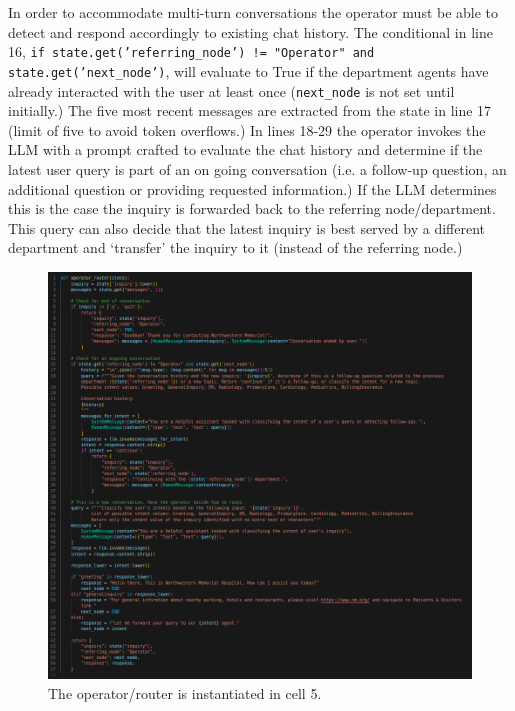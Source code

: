 \documentclass[11pt,letterpaper]{article}
\begin{document}
In order to accommodate multi-turn conversations the operator must be able to detect and respond accordingly to existing chat history.
The conditional in line 16, \texttt{if state.get('referring\_node') != "Operator" and state.get('next\_node')}, will evaluate to True if the department agents have already interacted with the user at least once (\texttt{next\_node} is not set until initially.) The five most recent messages are extracted from the state in line 17 (limit of five to avoid token overflows.) In lines 18-29 the operator invokes the LLM with a prompt crafted to evaluate the chat history and determine if the latest user query is part of an on going conversation (i.e. a follow-up question, an additional question or providing requested information.) If the LLM determines this is the case the inquiry is forwarded back to the referring node/department. This query can also decide that the latest inquiry is best served by a different department and `transfer' the inquiry to it (instead of the referring node.)

\clearpage

\begin{figure}[h!]
    \centering
    \includegraphics[width=1.0\linewidth]{cell_05.png}
    \caption{The operator/router is instantiated in cell 5.}
    \label{fig:operator}
\end{figure}
\end{document}
